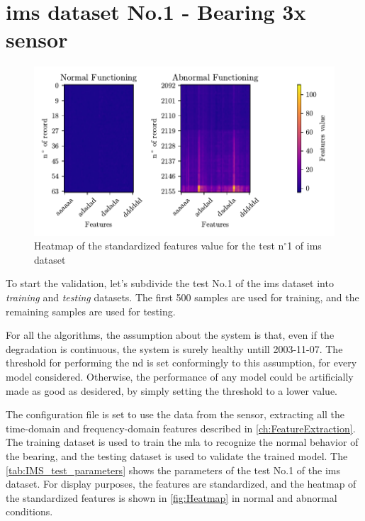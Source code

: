 \section{\gls{ims} dataset No.1 - Bearing 3x sensor}
\label{sec:ValidationOnRealWorldData}
\begin{figure}
    \centering
    \includegraphics{images/IMS/Heatmap.pdf}
    \caption{Heatmap of the standardized features value for the test $\text{n}^\circ$1 of \gls{ims} dataset}
    \label{fig:Heatmap}
\end{figure}


To start the validation, let's subdivide the test No.1 of the \gls{ims} dataset into \emph{training} and \emph{testing} datasets. The first 500 samples are used for training, and the remaining samples are used for testing. 

For all the algorithms, the assumption about the system is that, even if the degradation is continuous, the system is surely healthy untill 2003-11-07. The threshold for performing the \gls{nd} is set conformingly to this assumption, for every model considered. Otherwise, the performance of any model could be artificially made as good as desidered, by simply setting the threshold to a lower value.

The configuration file is set to use the data from the  sensor, extracting all the time-domain and frequency-domain features described in \autoref{ch:FeatureExtraction}. The training dataset is used to train the \gls{mla} to recognize the normal behavior of the bearing, and the testing dataset is used to validate the trained model. The \autoref{tab:IMS_test_parameters} shows the parameters of the test No.1 of the \gls{ims} dataset. For display purposes, the features are standardized, and the heatmap of the standardized features is shown in \autoref{fig:Heatmap} in normal and abnormal conditions.

